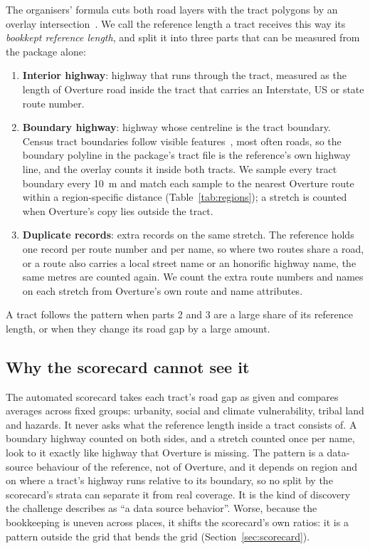 \documentclass[10pt,twocolumn,a4paper]{article}
\begin{document}
The organisers' formula cuts both road layers with the tract polygons by an overlay intersection~\cite{readme}. We call
the reference length a tract receives this way its \emph{bookkept reference length}, and split it into three parts that can
be measured from the package alone:
\begin{enumerate}
\item \textbf{Interior highway}: highway that runs through the tract, measured as the length of Overture road inside the
tract that carries an Interstate, US or state route number.
\item \textbf{Boundary highway}: highway whose centreline is the tract boundary. Census tract boundaries follow visible
features~\cite{garm}, most often roads, so the boundary polyline in the package's tract file is the reference's own
highway line, and the overlay counts it inside both tracts. We sample every tract boundary every 10~m and match each
sample to the nearest Overture route within a region-specific distance (Table~\ref{tab:regions}); a stretch is counted
when Overture's copy lies outside the tract.
\item \textbf{Duplicate records}: extra records on the same stretch. The reference holds one record per route number and
per name, so where two routes share a road, or a route also carries a local street name or an honorific highway name,
the same metres are counted again. We count the extra route numbers and names on each stretch from Overture's own route
and name attributes.
\end{enumerate}
A tract follows the pattern when parts 2 and 3 are a large share of its reference length, or when they change its road
gap by a large amount.

\subsection{Why the scorecard cannot see it}
The automated scorecard takes each tract's road gap as given and compares averages across fixed groups: urbanity, social and climate
vulnerability, tribal land and hazards. It never asks what the reference length inside a tract consists of. A boundary
highway counted on both sides, and a stretch counted once per name, look to it exactly like highway that Overture is
missing. The pattern is a data-source behaviour of the reference, not of Overture, and it depends on region and on where a
tract's highway runs relative to its boundary, so no split by the scorecard's strata can separate it from real coverage.
It is the kind of discovery the challenge describes as ``a data source behavior''. Worse, because the bookkeeping is
uneven across places, it shifts the scorecard's own ratios: it is a pattern outside the grid that bends the grid
(Section~\ref{sec:scorecard}).
\end{document}
